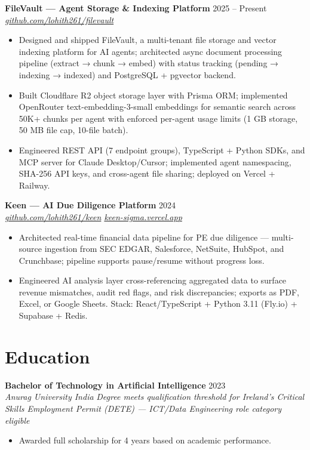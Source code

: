 \documentclass[10pt,letterpaper]{article}
\newcommand{\entry}[3]{%
  \vspace{3pt}\textbf{#1} \hfill #3 \\
  \textit{\small #2}\vspace{1pt}}
\begin{document}
\entry{FileVault --- Agent Storage \& Indexing Platform}{\href{https://github.com/lohith261/filevault}{github.com/lohith261/filevault}}{2025 -- Present}
\begin{itemize}
  \item Designed and shipped FileVault, a multi-tenant file storage and vector indexing platform for AI agents; architected async document processing pipeline (extract → chunk → embed) with status tracking (pending → indexing → indexed) and PostgreSQL + pgvector backend.
  \item Built Cloudflare R2 object storage layer with Prisma ORM; implemented OpenRouter text-embedding-3-small embeddings for semantic search across 50K+ chunks per agent with enforced per-agent usage limits (1 GB storage, 50 MB file cap, 10-file batch).
  \item Engineered REST API (7 endpoint groups), TypeScript + Python SDKs, and MCP server for Claude Desktop/Cursor; implemented agent namespacing, SHA-256 API keys, and cross-agent file sharing; deployed on Vercel + Railway.
\end{itemize}

\entry{Keen --- AI Due Diligence Platform}{\href{https://github.com/lohith261/keen}{github.com/lohith261/keen} \quad\textbullet\quad \href{https://keen-sigma.vercel.app/}{keen-sigma.vercel.app}}{2024}
\begin{itemize}
  \item Architected real-time financial data pipeline for PE due diligence --- multi-source ingestion from SEC EDGAR, Salesforce, NetSuite, HubSpot, and Crunchbase; pipeline supports pause/resume without progress loss.
  \item Engineered AI analysis layer cross-referencing aggregated data to surface revenue mismatches, audit red flags, and risk discrepancies; exports as PDF, Excel, or Google Sheets. Stack: React/TypeScript + Python 3.11 (Fly.io) + Supabase + Redis.
\end{itemize}

\section{Education}

\entry{Bachelor of Technology in Artificial Intelligence}{Anurag University \textbullet{} India}{2023}
\newline\textit{\small Degree meets qualification threshold for Ireland's Critical Skills Employment Permit (DETE) --- ICT/Data Engineering role category eligible}
\begin{itemize}
  \item Awarded full scholarship for 4 years based on academic performance.
\end{itemize}
\end{document}
